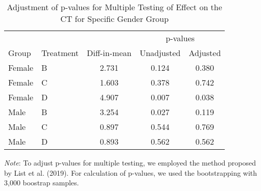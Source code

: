 \documentclass[12pt, a4paper]{article}
\begin{document}
\begin{table}[H]

\caption{\label{tab:mh-adjust-gender-test}Adjustment of p-values for Multiple Testing of Effect on the CT for Specific Gender Group}
\centering
\fontsize{8}{10}\selectfont
\begin{threeparttable}
\begin{tabular}[t]{llccc}
\toprule
\multicolumn{3}{c}{ } & \multicolumn{2}{c}{p-values} \\
\cmidrule(l{3pt}r{3pt}){4-5}
Group & Treatment & Diff-in-mean & Unadjusted & Adjusted\\
\midrule
Female & B & 2.731 & 0.124 & 0.380\\
Female & C & 1.603 & 0.378 & 0.742\\
Female & D & 4.907 & 0.007 & 0.038\\
Male & B & 3.254 & 0.027 & 0.119\\
Male & C & 0.897 & 0.544 & 0.769\\
Male & D & 0.893 & 0.562 & 0.562\\
\bottomrule
\end{tabular}
\begin{tablenotes}
\item \emph{Note}: To adjust p-values for multiple testing, we employed the method proposed by List et al. (2019). For calculation of p-values, we used the bootstrapping with 3,000 boostrap samples.
\end{tablenotes}
\end{threeparttable}
\end{table}
\end{document}
